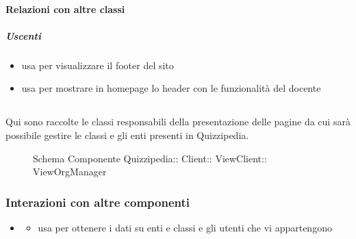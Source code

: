 \paragraph{Relazioni con altre classi}
\subparagraph{Uscenti}
\begin{itemize}
\item usa  per visualizzare il footer del sito
\item usa  per mostrare in homepage lo header con le funzionalità del docente
\end{itemize}
\subsection{}
Qui sono raccolte le classi responsabili della presentazione delle pagine da cui sarà possibile gestire le classi e gli enti presenti in Quizzipedia.
\begin{figure}[H]
\centering
\noindent{}
\caption[Schema Componente ViewOrgManager]{Schema Componente Quizzipedia:: Client:: ViewClient:: ViewOrgManager}
\end{figure}
\subsubsection{Interazioni con altre componenti}
\begin{itemize}
\item {}
\begin{itemize}
\item usa  per ottenere i dati su enti e classi e gli utenti che vi appartengono
\end{itemize}
\end{itemize}

